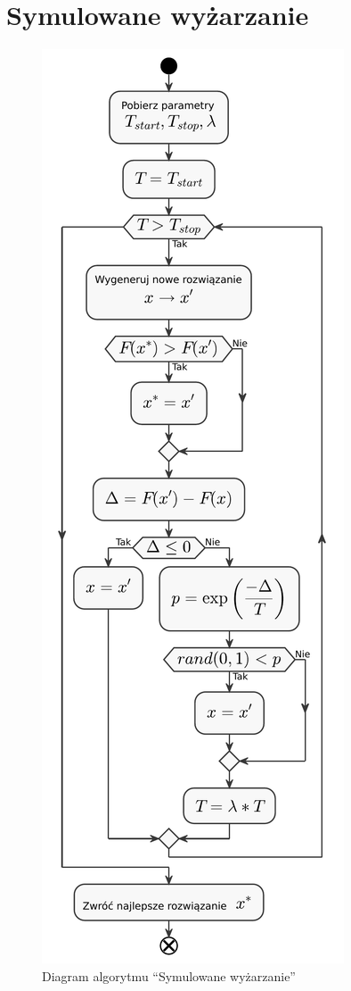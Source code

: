 \section{Symulowane wyżarzanie}
\begin{figure}[H]
    \centering
    \includegraphics[height=\textheight]{chapters/chapter4/sa.pdf}
    \caption{Diagram algorytmu ``Symulowane wyżarzanie''}
    \label{sa}
\end{figure}